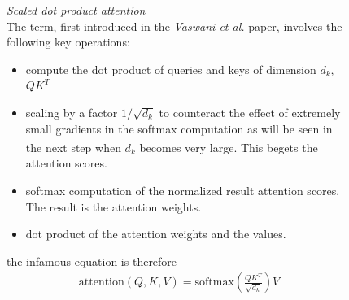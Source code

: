 \documentclass[12pt]{article}
\newcommand{\customtext}[3]{%
    \vspace{#2} %
    \fontsize{13}{8}\textcolor{#1}{\textit{#3}}%
}
\newcommand{\sidecite}[1]{\textsuperscript{\textcolor{blue}{\textbf{\scriptsize#1}}}}
\newcommand{\maincitecount}{\sidecite{\stepcounter{maincite}\themaincite}}
\begin{document}
\pagebreak
\begin{figure}[!htb]
    \begin{minipage}[t]{0.65\textwidth}
    \customtext{xtitle}{-1em}{Scaled dot product attention}\\
    The term, first introduced in the {\it Vaswani et al.} paper, involves the following key operations:
    \begin{itemize}[left=0pt,topsep=0pt,itemsep=0ex,parsep=0ex]
        \item compute the dot product of queries and keys of dimension $d_k$, $QK^T$
        \item scaling by a factor $1/\sqrt{d_k}$ to counteract the effect of extremely small gradients in the 
        softmax computation as will be seen in the next step when $d_k$ becomes very large{}{\maincitecount}.
        This begets the attention scores.
        \item softmax computation of the normalized result attention scores. The result is the attention weights.
        \item dot product of the attention weights and the values.
      \end{itemize}
      the infamous equation is therefore\\
      \vspace*{-2em}
      \begin{gather*}
          \text{attention}(Q,K,V)=\text{softmax}\left(\frac{QK^T}{\sqrt{d_k}}\right)V
      \end{gather*}
      \vspace*{-2em}
      \begin{figure}[H]
        \centering
\end{figure}
\end{minipage}
\end{figure}
\end{document}

